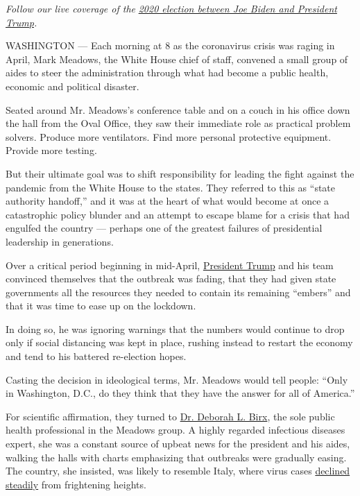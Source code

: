 \emph{Follow our live coverage of the}
\href{https://www.nytimes.com/2020/07/27/us/elections/biden-vs-trump.html}{\emph{2020
election between Joe Biden and President Trump}}\emph{.}

WASHINGTON --- Each morning at 8 as the coronavirus crisis was raging in
April, Mark Meadows, the White House chief of staff, convened a small
group of aides to steer the administration through what had become a
public health, economic and political disaster.

Seated around Mr. Meadows's conference table and on a couch in his
office down the hall from the Oval Office, they saw their immediate role
as practical problem solvers. Produce more ventilators. Find more
personal protective equipment. Provide more testing.

But their ultimate goal was to shift responsibility for leading the
fight against the pandemic from the White House to the states. They
referred to this as ``state authority handoff,'' and it was at the heart
of what would become at once a catastrophic policy blunder and an
attempt to escape blame for a crisis that had engulfed the country ---
perhaps one of the greatest failures of presidential leadership in
generations.

Over a critical period beginning in mid-April,
\href{https://www.nytimes.com/2020/07/28/us/politics/donald-fred-trump.html}{President
Trump} and his team convinced themselves that the outbreak was fading,
that they had given state governments all the resources they needed to
contain its remaining ``embers'' and that it was time to ease up on the
lockdown.

In doing so, he was ignoring warnings that the numbers would continue to
drop only if social distancing was kept in place, rushing instead to
restart the economy and tend to his battered re-election hopes.

Casting the decision in ideological terms, Mr. Meadows would tell
people: ``Only in Washington, D.C., do they think that they have the
answer for all of America.''

For scientific affirmation, they turned to
\href{https://www.state.gov/biographies/deborah-l-birx-md/}{Dr. Deborah
L. Birx}, the sole public health professional in the Meadows group. A
highly regarded infectious diseases expert, she was a constant source of
upbeat news for the president and his aides, walking the halls with
charts emphasizing that outbreaks were gradually easing. The country,
she insisted, was likely to resemble Italy, where virus cases
\href{https://www.nytimes.com/interactive/2020/world/europe/italy-coronavirus-cases.html}{declined
steadily} from frightening heights.

